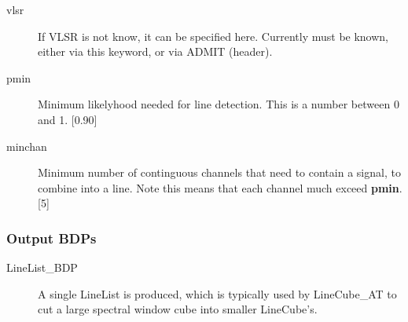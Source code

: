 \begin{description}
\item[vlsr] If VLSR is not know, it can be specified here. Currently must be known, either via
this keyword, or via ADMIT (header). %
\item[pmin]  Minimum likelyhood needed for line detection. This is a number between 0 and 1.
[0.90]
\item[minchan] Minimum number of continguous channels that need to contain a signal, 
to combine into a line. Note this means that each channel much exceed {\bf pmin}.
[5]
\end{description}

\subsubsection{Output BDPs}

\begin{description}
\item[LineList\_BDP] A single LineList is produced, which is typically used by LineCube\_AT
to cut a large spectral window cube into smaller LineCube's.
\end{description}



